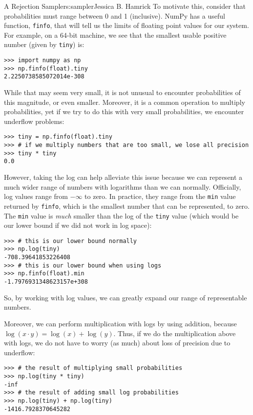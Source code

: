 \begin{aosachapter}{A Rejection Sampler}{s:sampler}{Jessica B. Hamrick}
To motivate this, consider that probabilities must range between 0 and 1
(inclusive). NumPy has a useful function, \texttt{finfo}, that will tell
us the limits of floating point values for our system. For example, on a
64-bit machine, we see that the smallest usable positive number (given
by \texttt{tiny}) is:

\begin{verbatim}
>>> import numpy as np
>>> np.finfo(float).tiny
2.2250738585072014e-308
\end{verbatim}

While that may seem very small, it is not unusual to encounter
probabilities of this magnitude, or even smaller. Moreover, it is a
common operation to multiply probabilities, yet if we try to do this
with very small probabilities, we encounter underflow problems:

\begin{verbatim}
>>> tiny = np.finfo(float).tiny
>>> # if we multiply numbers that are too small, we lose all precision
>>> tiny * tiny
0.0
\end{verbatim}

However, taking the log can help alleviate this issue because we can
represent a much wider range of numbers with logarithms than we can
normally. Officially, log values range from $-\infty$ to zero. In
practice, they range from the \texttt{min} value returned by
\texttt{finfo}, which is the smallest number that can be represented, to
zero. The \texttt{min} value is \emph{much} smaller than the log of the
\texttt{tiny} value (which would be our lower bound if we did not work
in log space):

\begin{verbatim}
>>> # this is our lower bound normally
>>> np.log(tiny)
-708.39641853226408
>>> # this is our lower bound when using logs
>>> np.finfo(float).min
-1.7976931348623157e+308
\end{verbatim}

So, by working with log values, we can greatly expand our range of
representable numbers.

Moreover, we can perform multiplication with logs by using addition,
because $\log(x\cdot{}y) = \log(x) +  \log(y)$. Thus, if we do the
multiplication above with logs, we do not have to worry (as much) about
loss of precision due to underflow:

\begin{verbatim}
>>> # the result of multiplying small probabilities
>>> np.log(tiny * tiny)
-inf
>>> # the result of adding small log probabilities
>>> np.log(tiny) + np.log(tiny)
-1416.7928370645282
\end{verbatim}


\end{aosachapter}
